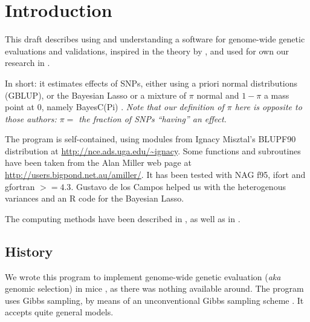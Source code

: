 \documentclass[a4paper,12pt,titlepage]{article}      %
\begin{document}
\newpage
\tableofcontents
\newpage

\section{Introduction}      %

This draft describes using and understanding a software for genome-wide genetic evaluations and validations, inspired in the theory by \cite{Meuwissen2001a}, and used for own our research in \cite{Legarra2008a}.

In short: it estimates effects of SNPs, either using a priori normal distributions (GBLUP), or the Bayesian Lasso \cite{tibshirani1996regression,Campos2009a,Legarra2011} or a mixture of $\pi$ normal and $1-\pi$ a mass point at 0, namely BayesC(Pi) \cite{Kizilkaya2010,Fernando2010}. \emph{Note that our definition of $\pi$ here is {\large opposite} to those authors: $\pi=$ the fraction of SNPs ``having'' an effect.}


The program is self-contained, using modules from Ignacy Misztal's BLUPF90 distribution at \url{http://nce.ads.uga.edu/~ignacy}. Some functions and subroutines have been taken from the Alan Miller web page at  \url{http://users.bigpond.net.au/amiller/}. It has been tested with  NAG f95, ifort and gfortran $>=4.3$. Gustavo de los Campos helped us with the heterogenous variances and an R code for the Bayesian Lasso.

The computing methods have been described in \cite{Legarra2008}, as well as in \cite{Fernando2010}. 

\subsection{History}

We wrote this program to implement genome-wide genetic evaluation (\emph{aka} genomic selection) in mice \cite{Legarra2008a}, as there was nothing available around. The program uses Gibbs sampling, by means of an unconventional Gibbs sampling scheme \cite{Legarra2008}. It accepts quite general models.
\end{document}

